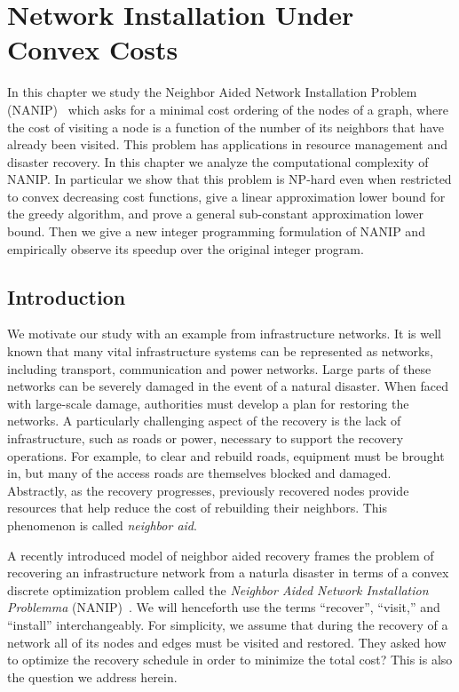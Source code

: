 \chapter{Network Installation Under Convex Costs}
\label{ch:nanip}

In this chapter we study the Neighbor Aided Network Installation Problem
(NANIP)~\cite{Gutfraind14} which asks for a minimal cost ordering of the nodes
of a graph, where the cost of visiting a node is a function of the number of
its neighbors that have already been visited. This problem has applications in
resource management and disaster recovery. In this chapter we analyze the
computational complexity of NANIP. In particular we show that this problem is
NP-hard even when restricted to convex decreasing cost functions, give a linear
approximation lower bound for the greedy algorithm, and prove a general
sub-constant approximation lower bound. Then we give a new integer programming
formulation of NANIP and empirically observe its speedup over the original
integer program.

\section{Introduction}

We motivate our study with an example from infrastructure networks.  It is
well known that many vital infrastructure systems can be represented as
networks, including transport, communication and power networks.  Large parts
of these networks can be severely damaged in the event of a natural disaster.
When faced with large-scale damage, authorities must develop a plan for
restoring the networks. A particularly challenging aspect of the recovery is
the lack of infrastructure, such as roads or power, necessary to support the
recovery operations.  For example, to clear and rebuild roads, equipment must
be brought in, but many of the access roads are themselves blocked and damaged.
Abstractly, as the recovery progresses, previously recovered nodes provide
resources that help reduce the cost of rebuilding their neighbors. This
phenomenon is called \emph{neighbor aid}.

A recently introduced model of neighbor aided recovery frames the problem of
recovering an infrastructure network from a naturla disaster in terms of a
convex discrete optimization problem called the \emph{Neighbor Aided Network
Installation Problemma} (NANIP)~\cite{Gutfraind14}.  We will henceforth use the
terms ``recover'', ``visit,'' and ``install'' interchangeably.  For simplicity,
we assume that during the recovery of a network all of its nodes and edges must
be visited and restored. They asked how to optimize the recovery schedule in
order to minimize the total cost?  This is also the question we address herein.

